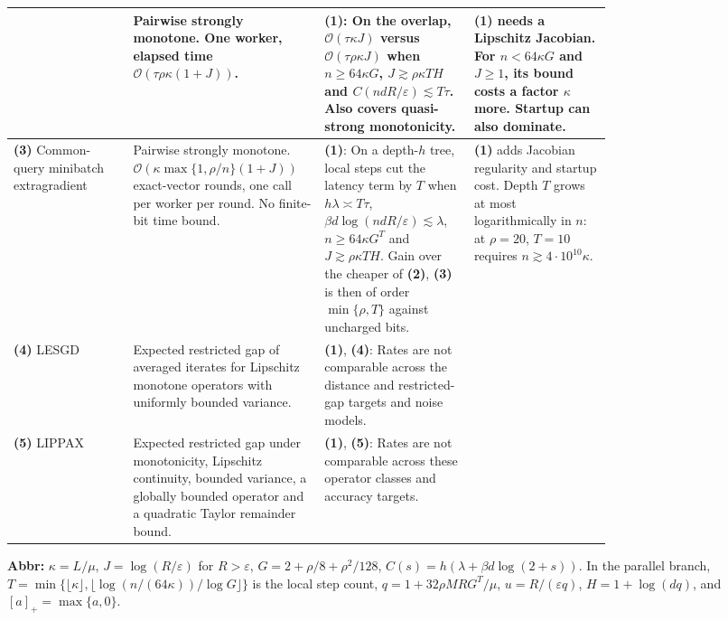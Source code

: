 \begin{table}[tp]
\begin{threeparttable}
\begin{tabularx}{\linewidth}{@{}>{\raggedright\arraybackslash}p{0.20\linewidth}>{\raggedright\arraybackslash}p{0.32\linewidth}>{\raggedright\arraybackslash}p{0.25\linewidth}>{\raggedright\arraybackslash}X@{}}
& Pairwise strongly monotone. One worker, elapsed time $\mathcal{O}(\tau\rho\kappa(1+J))$.
& \textbf{(1)}: On the overlap, $\mathcal{O}(\tau\kappa J)$ versus $\mathcal{O}(\tau\rho\kappa J)$ when $n\ge64\kappa G$, $J\gtrsim\rho\kappa T H$ and $C(ndR/\varepsilon)\lesssim T\tau$. Also covers quasi-strong monotonicity.
& \textbf{(1)} needs a Lipschitz Jacobian. For $n<64\kappa G$ and $J\ge1$, its bound costs a factor $\kappa$ more. Startup can also dominate. \\
\midrule
\textbf{(3)} Common-query minibatch extragradient \citep[Eq.~(34)]{djNovoselov2026v1}
& Pairwise strongly monotone. $\mathcal{O}(\kappa\max\{1,\rho/n\}(1+J))$ exact-vector rounds, one call per worker per round. No finite-bit time bound.
& \textbf{(1)}: On a depth-$h$ tree, local steps cut the latency term by $T$ when $h\lambda\asymp T\tau$, $\beta d\log(ndR/\varepsilon)\lesssim\lambda$, $n\ge64\kappa G^T$ and $J\gtrsim\rho\kappa T H$. Gain over the cheaper of \textbf{(2)}, \textbf{(3)} is then of order $\min\{\rho,T\}$ against uncharged bits.
& \textbf{(1)} adds Jacobian regularity and startup cost. Depth $T$ grows at most logarithmically in $n$: at $\rho=20$, $T=10$ requires $n\gtrsim4\cdot10^{10}\kappa$. \\
\midrule
\textbf{(4)} LESGD \citep[Thm.~1]{djWangKale2026v1}
& Expected restricted gap of averaged iterates for Lipschitz monotone operators with uniformly bounded variance.
& \textbf{(1)}, \textbf{(4)}: Rates are not comparable across the distance and restricted-gap targets and noise models. & \\
\midrule
\textbf{(5)} LIPPAX \citep[Thm.~4]{djWangKale2026v1}
& Expected restricted gap under monotonicity, Lipschitz continuity, bounded variance, a globally bounded operator and a quadratic Taylor remainder bound.
& \textbf{(1)}, \textbf{(5)}: Rates are not comparable across these operator classes and accuracy targets. & \\
\bottomrule
\end{tabularx}
\begin{tablenotes}[flushleft]\footnotesize
\item[] \textbf{Abbr:} $\kappa=L/\mu$, $J=\log(R/\varepsilon)$ for $R>\varepsilon$, $G=2+\rho/8+\rho^2/128$, $C(s)=h(\lambda+\beta d\log(2+s))$. In the parallel branch, $T=\min\{\lfloor\kappa\rfloor,\lfloor\log(n/(64\kappa))/\log G\rfloor\}$ is the local step count, $q=1+32\rho MRG^T/\mu$, $u=R/(\varepsilon q)$, $H=1+\log(dq)$, and $[a]_+=\max\{a,0\}$.
\end{tablenotes}
\end{threeparttable}
\end{table}

